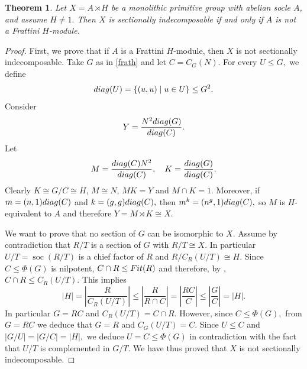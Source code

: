 \documentclass[10pt,a4paper]{amsart}
\newtheorem{thm}{Theorem}[section]
\DeclareMathOperator{\soc}{soc}
\begin{document}
\begin{thm}\label{t:char-frath}
    Let $X=A\rtimes H$ be a monolithic primitive group with abelian socle $A$, and assume $H\neq 1.$ Then $X$ is sectionally indecomposable if and only if $A$ is not a Frattini $H$-module.
\end{thm}

\begin{proof}
First, we prove that if $A$ is a Frattini $H$-module, then $X$ is not sectionally indecomposable. Take $G$ as in \cref{frath} and let $C=C_G(N)$. For every $U\leq G,$
we define $${\rm{diag}}(U)=\{(u,u)\mid u\in U\}\leq G^2.$$
Consider $$Y=\frac{N^2 {\rm{diag}}(G)}{{\rm{diag}}(C)}.$$
Let $$M=\frac{{\rm{diag}}(C)N^2}{{\rm{diag}}(C)},\quad K=\frac{{\rm{diag}}(G)}{{\rm{diag}}(C)}.$$ Clearly $K\cong G/C \cong H$, $M\cong N$, $MK=Y$
and $M\cap K=1.$ Moreover, if $m=(n,1){\rm{diag}}(C)$ and $k=(g,g){\rm{diag}}(C),$ then $m^k=(n^g,1){\rm{diag}}(C),$ so $M$ is $H$-equivalent to $A$
and therefore $Y=M\rtimes K \cong X.$ 

We want to prove that no section of $G$ can be isomorphic to $X$. Assume by contradiction that $R/T$ is a section of $G$ with $R/T\cong X$. In particular  $U/T=\soc(R/T)$ is a chief factor of $R$ and  $R/C_R(U/T)\cong H.$ Since $C\leq \Phi(G)$ is nilpotent,
$C\cap R\leq {\rm{Fit}}(R)$ and therefore, by \cite[5.2.9]{rob},
$C\cap R\leq C_R(U/T).$
This implies
$$|H|=\left|\frac{R}{C_R(U/T)}\right|\leq \left|\frac{R}{R\cap C}\right|=\left|\frac{RC}{C}\right|\leq \left|\frac{G}{C}\right|=|H|.$$
In particular $G=RC$ and $C_R(U/T)=C\cap R$. However, since $C\leq \Phi(G),$ from $G=RC$ we deduce that $G=R$ and $C_G(U/T)=C.$ Since $U\leq C$ and $|G/U|=|G/C|=|H|,$ we deduce $U=C\leq \Phi(G)$ in contradiction with the fact that $U/T$ is complemented in $G/T.$ We have thus proved that $X$ is not sectionally indecomposable.


\end{proof}
\end{document}
